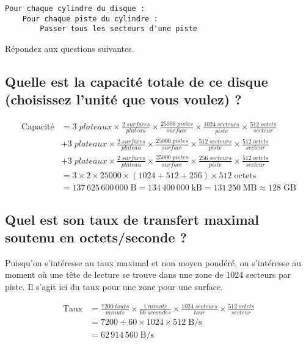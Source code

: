 \documentclass[10pt,letterpaper]{article}
\begin{document}
\begin{verbatim}
Pour chaque cylindre du disque :
    Pour chaque piste du cylindre :
        Passer tous les secteurs d'une piste
\end{verbatim}

\noindent Répondez aux questions suivantes.
\subsection{Quelle est la capacité totale de ce disque (choisissez l'unité que vous voulez) ?}

\begin{align*}
\text{Capacité} &= 3 \; plateaux \times \frac{2 \; surfaces}{plateau} \times \frac{25000 \; pistes}{surface} \times \frac{1024 \; secteurs}{piste} \times \frac{512 \; octets}{secteur} \\
&+ 3 \; plateaux \times \frac{2 \; surfaces}{plateau} \times \frac{25000 \; pistes}{surface} \times \frac{512 \; secteurs}{piste} \times \frac{512 \; octets}{secteur} \\
&+ 3 \; plateaux \times \frac{2 \; surfaces}{plateau} \times \frac{25000 \; pistes}{surface} \times \frac{256 \; secteurs}{piste} \times \frac{512 \; octets}{secteur} \\
&= 3 \times 2 \times 25000 \times (1024 + 512 + 256) \times 512 \; \text{octets} \\
&= 137 \, 625 \, 600 \, 000 \; \text{B} = 134 \, 400 \, 000 \; \text{kB} = 131 \, 250 \; \text{MB} \approx 128 \; \text{GB}
\end{align*}
\bigskip

\subsection{Quel est son taux de transfert maximal soutenu en octets/seconde ?}
Puisqu'on s'intéresse au taux maximal et non moyen pondéré, on s'intéresse au moment où une tête de lecture se trouve dans une zone de 1024 secteurs par piste. Il s'agit ici du taux pour une zone pour une surface.

\begin{align*}
\text{Taux} &= \frac{7200 \; tours}{minute} \times \frac{1 \; minute}{60 \; secondes} \times \frac{1024 \; secteurs}{tour} \times \frac{512 \; octets}{secteur} \\
&= 7200 \div 60 \times 1024 \times 512 \; \text{B/s} \\
&= 62 \, 914 \, 560 \; \text{B/s}
\end{align*}
\bigskip
\end{document}
